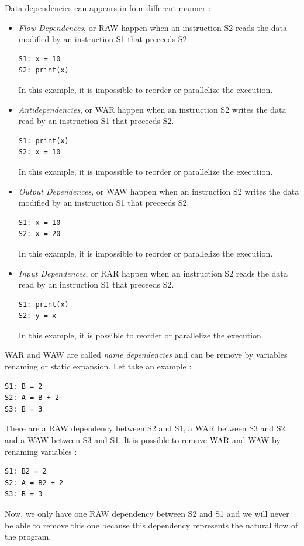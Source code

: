 Data dependencies can appears in four different manner :
\begin{itemize}
\item \emph{Flow Dependences}, or \ac{RAW} happen when an instruction S2 reads the data modified by an instruction S1 that preceeds S2. 
\begin{lstlisting}[frame=single]
S1: x = 10
S2: print(x)
\end{lstlisting}
In this example, it is impossible to reorder or parallelize the execution.

\item \emph{Antidependencies}, or \ac{WAR} happen when an instruction S2 writes the data read by an instruction S1 that preceeds S2.
\begin{lstlisting}[frame=single]
S1: print(x)
S2: x = 10
\end{lstlisting}
In this example, it is impossible to reorder or parallelize the execution.

\item \emph{Output Dependences}, or \ac{WAW} happen when an instruction S2 writes the data modified by an instruction S1 that preceeds S2.
\begin{lstlisting}[frame=single]
S1: x = 10
S2: x = 20
\end{lstlisting}
In this example, it is impossible to reorder or parallelize the execution.

\item \emph{Input Dependences}, or \ac{RAR} happen when an instruction S2 reads the data read by an instruction S1 that preceeds S2. 
\begin{lstlisting}[frame=single]
S1: print(x)
S2: y = x
\end{lstlisting}
In this example, it is possible to reorder or parallelize the execution.
\end{itemize}

\ac{WAR} and \ac{WAW} are called \emph{name dependencies} and can be remove by variables renaming or static expansion. Let take an example :
\begin{lstlisting}[frame=single]
S1: B = 2
S2: A = B + 2
S3: B = 3
\end{lstlisting}

There are a \ac{RAW} dependency between S2 and S1, a \ac{WAR} between S3 and S2 and a \ac{WAW} between S3 and S1. It is possible to remove \ac{WAR} and \ac{WAW} by renaming variables :
\begin{lstlisting}[frame=single]
S1: B2 = 2
S2: A = B2 + 2
S3: B = 3
\end{lstlisting}
Now, we only have one \ac{RAW} dependency between S2 and S1 and we will never be able to remove this one because this dependency represents the natural flow of the program.

